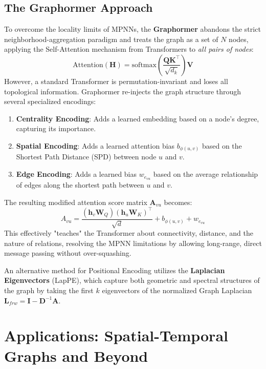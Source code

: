 \subsection{The Graphormer Approach}
To overcome the locality limits of MPNNs, the \textbf{Graphormer} abandons the strict neighborhood-aggregation paradigm and treats the graph as a set of $N$ nodes, applying the Self-Attention mechanism from Transformers to \textit{all pairs of nodes}:
\begin{equation}
    \text{Attention}(\mathbf{H}) = \text{softmax} \left( \frac{\mathbf{Q}\mathbf{K}^\top}{\sqrt{d_k}} \right) \mathbf{V}
\end{equation}
However, a standard Transformer is permutation-invariant and loses all topological information. Graphormer re-injects the graph structure through several specialized encodings:
\begin{enumerate}
    \item \textbf{Centrality Encoding}: Adds a learned embedding based on a node's degree, capturing its importance.
    \item \textbf{Spatial Encoding}: Adds a learned attention bias $b_{\phi(u,v)}$ based on the Shortest Path Distance (SPD) between node $u$ and $v$.
    \item \textbf{Edge Encoding}: Adds a learned bias $w_{e_{vu}}$ based on the average relationship of edges along the shortest path between $u$ and $v$.
\end{enumerate}
The resulting modified attention score matrix $\mathbf{A}_{vu}$ becomes:
\begin{equation}
    A_{vu} = \frac{(\mathbf{h}_v \mathbf{W}_Q)(\mathbf{h}_u \mathbf{W}_K)^\top}{\sqrt{d}} + b_{\phi(u,v)} + w_{e_{vu}}
\end{equation}
This effectively "teaches" the Transformer about connectivity, distance, and the nature of relations, resolving the MPNN limitations by allowing long-range, direct message passing without over-squashing.

An alternative method for Positional Encoding utilizes the \textbf{Laplacian Eigenvectors} (LapPE), which capture both geometric and spectral structures of the graph by taking the first $k$ eigenvectors of the normalized Graph Laplacian $\mathbf{L}_{frw} = \mathbf{I} - \mathbf{D}^{-1}\mathbf{A}$.

\section{Applications: Spatial-Temporal Graphs and Beyond}

